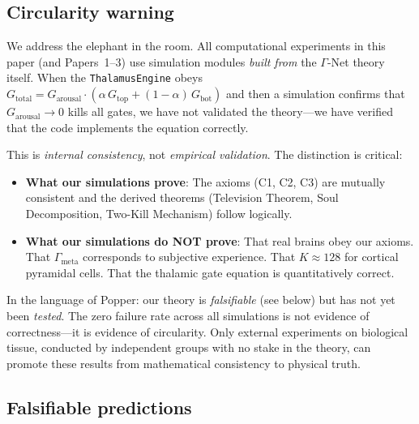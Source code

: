 \documentclass[aps,pre,twocolumn,superscriptaddress,floatfix]{revtex4-2}
\begin{document}
\subsection{Circularity warning}

We address the elephant in the room.
All computational experiments in this paper (and Papers~1--3)
use simulation modules \emph{built from} the $\Gamma$-Net
theory itself.  When the \texttt{ThalamusEngine} obeys
$G_{\text{total}}=G_{\text{arousal}}\cdot(\alpha\,G_{\text{top}}+(1-\alpha)\,G_{\text{bot}})$
and then a simulation confirms that $G_{\text{arousal}}\to 0$
kills all gates, we have not validated the theory---we have
verified that the code implements the equation correctly.

This is \emph{internal consistency}, not \emph{empirical
validation}.  The distinction is critical:
\begin{itemize}
  \item \textbf{What our simulations prove}:
    The axioms (C1, C2, C3) are mutually consistent and the
    derived theorems (Television Theorem, Soul Decomposition,
    Two-Kill Mechanism) follow logically.
  \item \textbf{What our simulations do NOT prove}:
    That real brains obey our axioms.
    That $\Gamma_{\text{meta}}$ corresponds to subjective
    experience.  That $K\approx 128$ for cortical pyramidal
    cells.  That the thalamic gate equation is quantitatively
    correct.
\end{itemize}

In the language of Popper: our theory is \emph{falsifiable}
(see below) but has not yet been \emph{tested}.  The zero
failure rate across all simulations is not evidence of
correctness---it is evidence of circularity.
Only external experiments on biological tissue, conducted by
independent groups with no stake in the theory, can
promote these results from mathematical consistency to
physical truth.

\subsection{Falsifiable predictions}
\end{document}
